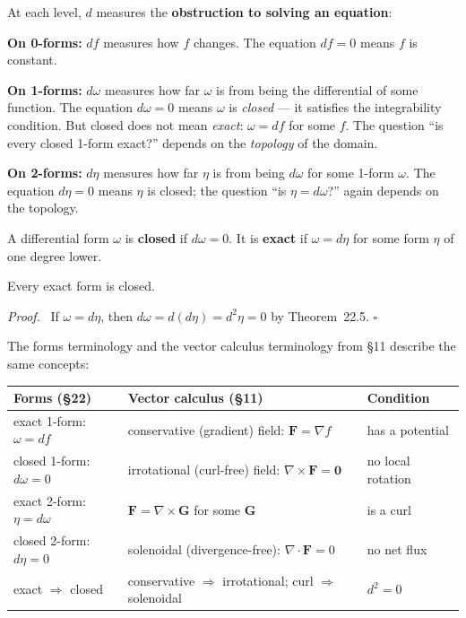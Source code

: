 \documentclass[11pt]{report}
\renewenvironment{proof}[1][Proof]{\par\noindent\textit{#1.}\ }{\hfill$\square$\par\medskip}
\begin{document}
At each level, $d$ measures the \textbf{obstruction to solving an equation}:

\textbf{On 0-forms:} $df$ measures how $f$ changes. The equation $df = 0$ means $f$ is constant.

\textbf{On 1-forms:} $d\omega$ measures how far $\omega$ is from being the differential of some function. The equation $d\omega = 0$ means $\omega$ is \textit{closed} --- it satisfies the integrability condition. But closed does not mean \textit{exact}: $\omega = df$ for some $f$. The question ``is every closed 1-form exact?'' depends on the \textit{topology} of the domain.

\textbf{On 2-forms:} $d\eta$ measures how far $\eta$ is from being $d\omega$ for some 1-form $\omega$. The equation $d\eta = 0$ means $\eta$ is closed; the question ``is $\eta = d\omega$?'' again depends on the topology.

\begin{definition}
A differential form $\omega$ is \textbf{closed} if $d\omega = 0$. It is \textbf{exact} if $\omega = d\eta$ for some form $\eta$ of one degree lower.
\end{definition}

\begin{proposition}
Every exact form is closed.
\end{proposition}

\begin{proof}
If $\omega = d\eta$, then $d\omega = d(d\eta) = d^2\eta = 0$ by Theorem~22.5.
\end{proof}

The forms terminology and the vector calculus terminology from \S11 describe the same concepts:

\begin{center}
\renewcommand{\arraystretch}{1.4}
\begin{tabular}{|l|l|l|}
\hline
\textbf{Forms (\S22)} & \textbf{Vector calculus (\S11)} & \textbf{Condition} \\
\hline
exact 1-form: $\omega = df$ & conservative (gradient) field: $\mathbf{F} = \nabla f$ & has a potential \\
\hline
closed 1-form: $d\omega = 0$ & irrotational (curl-free) field: $\nabla \times \mathbf{F} = \mathbf{0}$ & no local rotation \\
\hline
exact 2-form: $\eta = d\omega$ & $\mathbf{F} = \nabla \times \mathbf{G}$ for some $\mathbf{G}$ & is a curl \\
\hline
closed 2-form: $d\eta = 0$ & solenoidal (divergence-free): $\nabla \cdot \mathbf{F} = 0$ & no net flux \\
\hline
exact $\Rightarrow$ closed & conservative $\Rightarrow$ irrotational; \; curl $\Rightarrow$ solenoidal & $d^2 = 0$ \\
\hline
\end{tabular}
\end{center}
\end{document}
